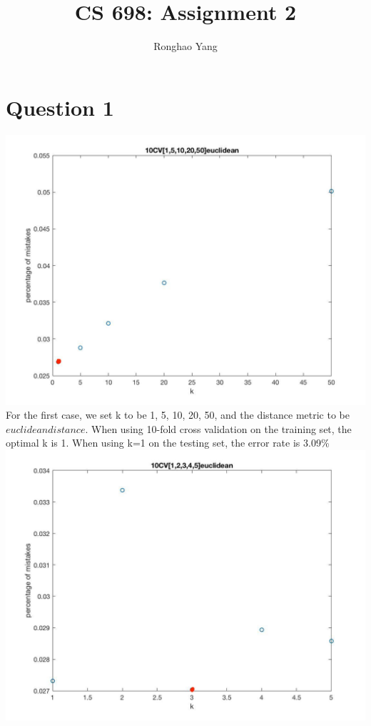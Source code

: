 \documentclass[11pt]{article} %
\title{CS 698: Assignment 2}
\author{Ronghao Yang}
\begin{document}
\maketitle

\section{Question 1}
\includegraphics[scale=0.4]{10CV[1,5,10,20,50]euclidean.jpg}\\\linebreak
For the first case, we set k to be 1, 5, 10, 20, 50, and the distance metric to be $euclidean distance$. When using 10-fold cross validation on the training set, the optimal k is 1. When using k=1 on the testing set, the error rate is 3.09\%\\
\includegraphics[scale=0.4]{10CV[1,2,3,4,5]euclidean.jpg}\\
\end{document}
